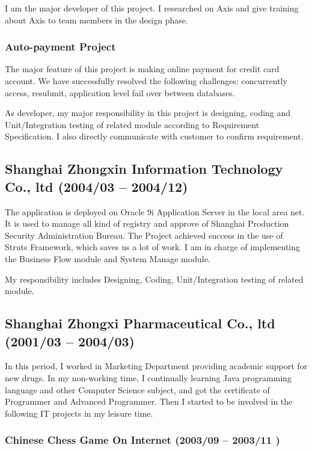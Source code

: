 \documentclass[a4paper,12pt]{article}
\begin{document}
I am the major developer of this project. I researched on Axis and give training about Axis to team members in the design phase. 

\subsubsection{Auto-payment Project}

The major feature of this project is making online payment for credit card account.
We have successfully resolved the following challenges: concurrently access, resubmit, application level fail over between databases.

As developer, my major responsibility in this project is designing, coding and Unit/Integration testing of related module according to Requirement Specification. I also directly communicate with customer to confirm requirement.
 

\subsection{Shanghai Zhongxin Information Technology Co., ltd (2004/03 -- 2004/12) }

The application is deployed on Oracle 9i Application Server in the local area net. It is used to manage all kind of  registry and approve of Shanghai Production Security Administration Bureau. The Project achieved success in the use of Struts Framework, which saves us a lot of work. I am in charge of implementing the Business Flow module and System Manage module. 

My responsibility includes Designing, Coding, Unit/Integration testing of related module. 

\subsection{ Shanghai Zhongxi Pharmaceutical Co., ltd (2001/03 -- 2004/03) }

In this period, I worked in Marketing Department providing academic support for new drugs. In my non-working time, I continually learning Java programming language and other Computer Science subject, and got the certificate of Programmer and Advanced Programmer. Then I started to be involved in the following IT projects in my leisure time.

\subsubsection{  Chinese Chess Game On Internet (2003/09 -- 2003/11    )}
\end{document}
